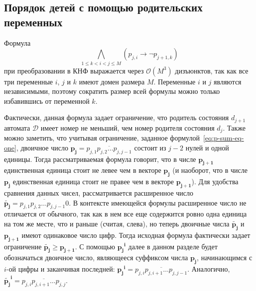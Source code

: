 
\subsection{Порядок детей с помощью родительских переменных}
\label{sec:space:tight:p-order}


Формула
\begin{equation*}
\bigwedge_{1 \leq k < i < j \leq M} \left(p_{j,i} \rightarrow \neg p_{j + 1, k}\right)
\end{equation*}
при преобразовании в КНФ выражается через $\mathcal{O}\left(M^{3}\right)$ дизъюнктов, так как все три переменные $i$, $j$ и $k$ имеют домен размера $M$.
Переменные $i$ и $j$ являются независимыми, поэтому сократить размер всей формулы можно только избавившись от переменной $k$.

Фактически, данная формула задает ограничение, что родитель состояния $d_{j + 1}$ автомата $\mathcal{D}$ имеет номер не меньший, чем номер родителя состояния $d_{j}$. 
Также можно заметить, что учитывая ограничение, заданное формулой~\eqref{eq:p-sum-eq-one}, двоичное число $\mathbf{p_{j}}=\overline{p_{j,1}p_{j,2}\ldots p_{j,j-1}}$ состоит из $j - 2$ нулей и одной единицы.
Тогда рассматриваемая формула говорит, что в числе $\mathbf{p_{j + 1}}$ единственная единица стоит не левее чем в векторе $\mathbf{p_{j}}$ (и наоборот, что в числе $\mathbf{p_{j}}$ единственная единица стоит не правее чем в векторе $\mathbf{p_{j + 1}}$). 
Для удобства сравнения данных чисел, рассматривается расширенное число $\tilde{\mathbf{p_{j}}} = \overline{p_{j,1}p_{j,2}\ldots p_{j,j-1}0}$.
В контексте имеющейся формулы расширенное число не отличается от обычного, так как в нем все еще содержится ровно одна единица на том же месте, что и раньше (считая, слева), но теперь двоичные числа $\tilde{\mathbf{p_{j}}}$ и $\mathbf{p_{j+1}}$ имеют одинаковое число цифр.
Тогда исходная формула фактически задает ограничение $\tilde{\mathbf{p_{j}}} \geq \mathbf{p_{j + 1}}$.
С помощью $\mathbf{p_{j}}^{\mathbf{i}}$ далее в данном разделе будет обозначаться двоичное число, являющееся суффиксом числа $\mathbf{p_{j}}$, начинающимся с $i$-ой цифры и заканчивая последней: $\mathbf{p_{j}}^{\mathbf{i}}=\overline{p_{j,i}p_{j,i+1}\ldots p_{j,j - 1}}$.
Аналогично, $\tilde{\mathbf{p_{j}}}^{\mathbf{i}}=\overline{p_{j,i}p_{j,i+1}\ldots p_{j,j}}$.

